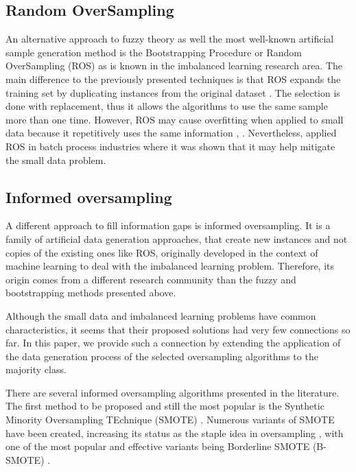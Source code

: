 \subsection{Random OverSampling}

An alternative approach to fuzzy theory as well the most well-known artificial sample generation method is the Bootstrapping Procedure \cite{AbdulLateh.2017} or Random OverSampling (ROS) as is known in the imbalanced learning research area. The main difference to the previously presented techniques is that ROS expands the training set by duplicating instances from the original dataset \cite{Efron.1993}. The selection is done with replacement, thus it allows the algorithms to use the same sample more than one time. However, ROS may cause overfitting when applied to small data because it repetitively uses the same information \cite{Tsai.2015}, \cite{Li.2018}. Nevertheless, \cite{Ivanescu.2006} applied ROS in batch process industries where it was shown that it may help mitigate the small data problem.

\subsection{Informed oversampling}

A different approach to fill information gaps is informed oversampling. It is a family of artificial data generation approaches, that create new instances and not copies of the existing ones like ROS, originally developed in the context of machine learning to deal with the imbalanced learning problem. Therefore, its origin comes from a different research community than the fuzzy and bootstrapping methods presented above. 

Although the small data and imbalanced learning problems have common characteristics, it seems that their proposed solutions had very few connections so far. In this paper, we provide such a connection by extending the application of the data generation process of the selected oversampling algorithms to the majority class.

There are several informed oversampling algorithms presented in the literature. The first method to be proposed and still the most popular is the Synthetic Minority Oversampling TEchnique (SMOTE) \cite{Chawla.2002}. Numerous variants of SMOTE have been created, increasing its status as the staple idea in oversampling \cite{Fernandez.2018}, with one of the most popular and effective variants being Borderline SMOTE (B-SMOTE) \cite{Han.2005}. 

